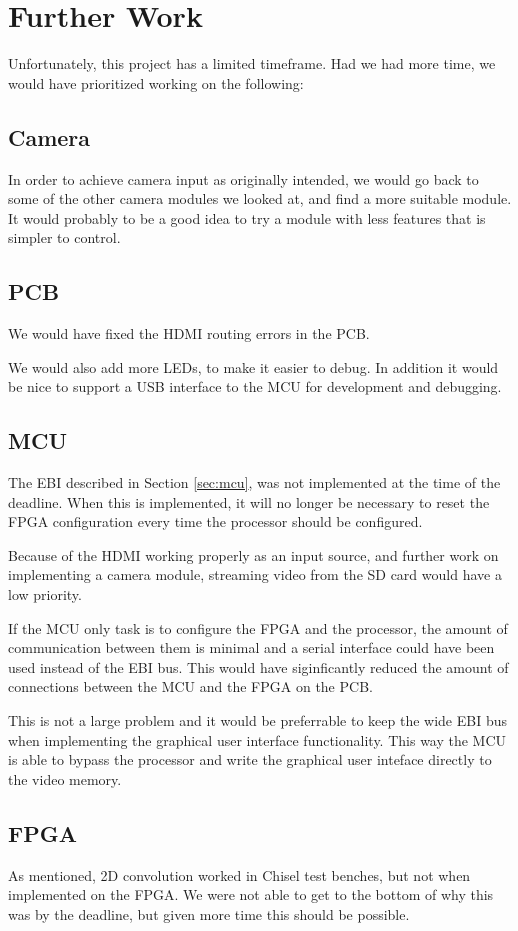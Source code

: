 \section{Further Work}

Unfortunately, this project has a limited timeframe.
Had we had more time, we would have prioritized working on the following:

\subsection{Camera}

In order to achieve camera input as originally intended, we would go back to some of the other camera modules we looked at, and find a more suitable module.
It would probably to be a good idea to try a module with less features that is simpler to control.

\subsection{PCB}

We would have fixed the HDMI routing errors in the PCB.

We would also add more LEDs, to make it easier to debug.
In addition it would be nice to support a USB interface to the MCU for development and debugging.

\subsection{MCU}

The EBI described in Section \ref{sec:mcu}, was not implemented at the time of the deadline.
When this is implemented, it will no longer be necessary to reset the FPGA configuration every time the processor should be configured. 

Because of the HDMI working properly as an input source, and further work on implementing a camera module, streaming video from the SD card would have a low priority.

If the MCU only task is to configure the FPGA and the processor, the amount of communication between them is minimal and a serial interface could have been used instead of the EBI bus. This would have siginficantly reduced the amount of connections between the MCU and the FPGA on the PCB.

This is not a large problem and it would be preferrable to keep the wide EBI bus when implementing the graphical user interface functionality. This way the MCU is able to bypass the processor and write the graphical user inteface directly to the video memory.

\subsection{FPGA}

As mentioned, 2D convolution worked in Chisel test benches, but not when implemented on the FPGA.
We were not able to get to the bottom of why this was by the deadline, but given more time this should be possible.

